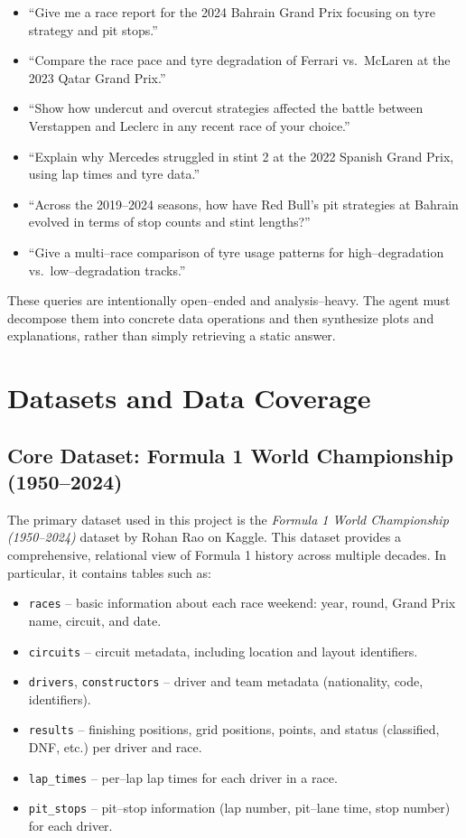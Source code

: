 \documentclass[11pt]{article}
\begin{document}
\begin{itemize}[leftmargin=1.5em]
    \item ``Give me a race report for the 2024 Bahrain Grand Prix focusing on tyre strategy and pit stops.''
    \item ``Compare the race pace and tyre degradation of Ferrari vs.\ McLaren at the 2023 Qatar Grand Prix.''
    \item ``Show how undercut and overcut strategies affected the battle between Verstappen and Leclerc in any recent race of your choice.''
    \item ``Explain why Mercedes struggled in stint 2 at the 2022 Spanish Grand Prix, using lap times and tyre data.''
    \item ``Across the 2019--2024 seasons, how have Red Bull's pit strategies at Bahrain evolved in terms of stop counts and stint lengths?''
    \item ``Give a multi–race comparison of tyre usage patterns for high–degradation vs.\ low–degradation tracks.''
\end{itemize}

These queries are intentionally open–ended and analysis–heavy. The agent must decompose them into concrete data operations and then synthesize plots and explanations, rather than simply retrieving a static answer.

\section{Datasets and Data Coverage}

\subsection{Core Dataset: Formula 1 World Championship (1950--2024)}

The primary dataset used in this project is the \emph{Formula 1 World Championship (1950--2024)} dataset by Rohan Rao on Kaggle. This dataset provides a comprehensive, relational view of Formula 1 history across multiple decades. In particular, it contains tables such as:

\begin{itemize}[leftmargin=1.5em]
    \item \texttt{races} -- basic information about each race weekend: year, round, Grand Prix name, circuit, and date.
    \item \texttt{circuits} -- circuit metadata, including location and layout identifiers.
    \item \texttt{drivers}, \texttt{constructors} -- driver and team metadata (nationality, code, identifiers).
    \item \texttt{results} -- finishing positions, grid positions, points, and status (classified, DNF, etc.) per driver and race.
    \item \texttt{lap\_times} -- per–lap lap times for each driver in a race.
    \item \texttt{pit\_stops} -- pit–stop information (lap number, pit–lane time, stop number) for each driver.
\end{itemize}
\end{document}

